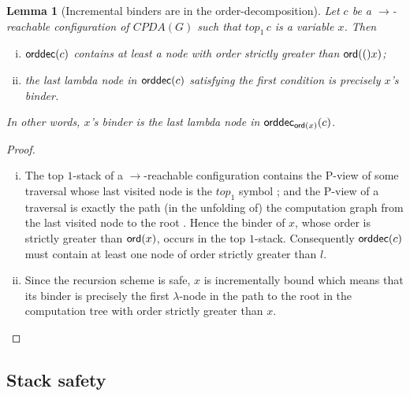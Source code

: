 \documentclass[a4paper,draft]{article}
\newtheorem{lemma}{Lemma}[section]
\theoremstyle{remark}
\theoremstyle{definition}
\newcommand\orddec{{\sf orddec}}
\begin{document}
\begin{lemma}[Incremental binders are in the order-decomposition]
\label{lem:binder_in_ordecompos} Let $c$ be a $\rightarrow$-reachable
configuration of $CPDA(G)$ such that $top_1\,c$ is a variable $x$. Then
\begin{enumerate}[(i)]
\item $\orddec(c)$ contains at least a node with order strictly greater than ${\sf ord}(()x)$;
\item the last lambda node in $\orddec(c)$ satisfying the first condition is precisely $x$'s binder.
\end{enumerate}
In other words, $x$'s binder is the last lambda node in $\orddec_{\ord x}(c)$.
\end{lemma}
\begin{proof}
\begin{enumerate}[(i)]
\item The top $1$-stack of a $\rightarrow$-reachable configuration contains the P-view of some traversal whose last visited node is the $top_1$ symbol \cite[Corollary 8]{hague-collaps-full}; and
    the P-view of a traversal is exactly the path (in the unfolding of) the
    computation graph from the last visited node to
    the root \cite[Proposition 6]{OngLics2006}. Hence the binder of $x$, whose order
    is strictly greater than ${\sf ord}(x)$, occurs in the top $1$-stack.
    Consequently $\orddec(c)$ must contain at least one node of order strictly greater than $l$.

\item Since the recursion scheme is safe, $x$ is
 incrementally bound \cite{blumong:safelambdacalculus}
 which means that its binder is precisely the first $\lambda$-node in the
 path to the root in the computation tree with order strictly
 greater than $x$. \qedhere
\end{enumerate}
\end{proof}

\subsection{Stack safety}
\end{document}
